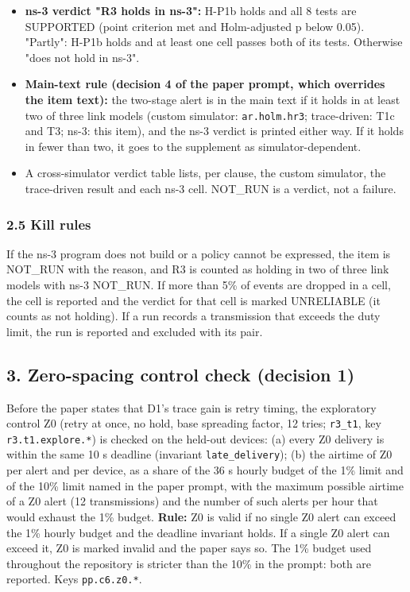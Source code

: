 \begin{itemize}
\item \textbf{ns-3 verdict "R3 holds in ns-3":} H-P1b holds and all 8 tests are SUPPORTED (point criterion met and Holm-adjusted p below 0.05). "Partly": H-P1b holds and at least one cell passes both of its tests. Otherwise "does not hold in ns-3".
\item \textbf{Main-text rule (decision 4 of the paper prompt, which overrides the item text):} the two-stage alert is in the main text if it holds in at least two of three link models (custom simulator: \texttt{ar.holm.hr3}; trace-driven: T1c and T3; ns-3: this item), and the ns-3 verdict is printed either way. If it holds in fewer than two, it goes to the supplement as simulator-dependent.
\item A cross-simulator verdict table lists, per clause, the custom simulator, the trace-driven result and each ns-3 cell. NOT\_RUN is a verdict, not a failure.
\end{itemize}

\subsubsection*{2.5 Kill rules}

If the ns-3 program does not build or a policy cannot be expressed, the item is NOT\_RUN with the reason, and R3 is counted as holding in two of three link models with ns-3 NOT\_RUN. If more than 5\% of events are dropped in a cell, the cell is reported and the verdict for that cell is marked UNRELIABLE (it counts as not holding). If a run records a transmission that exceeds the duty limit, the run is reported and excluded with its pair.

\subsection*{3. Zero-spacing control check (decision 1)}

Before the paper states that D1's trace gain is retry timing, the exploratory control Z0 (retry at once, no hold, base spreading factor, 12 tries; \texttt{r3\_t1}, key \texttt{r3.t1.explore.*}) is checked on the held-out devices: (a) every Z0 delivery is within the same 10 s deadline (invariant \texttt{late\_delivery}); (b) the airtime of Z0 per alert and per device, as a share of the 36 s hourly budget of the 1\% limit and of the 10\% limit named in the paper prompt, with the maximum possible airtime of a Z0 alert (12 transmissions) and the number of such alerts per hour that would exhaust the 1\% budget. \textbf{Rule:} Z0 is valid if no single Z0 alert can exceed the 1\% hourly budget and the deadline invariant holds. If a single Z0 alert can exceed it, Z0 is marked invalid and the paper says so. The 1\% budget used throughout the repository is stricter than the 10\% in the prompt: both are reported. Keys \texttt{pp.c6.z0.*}.

